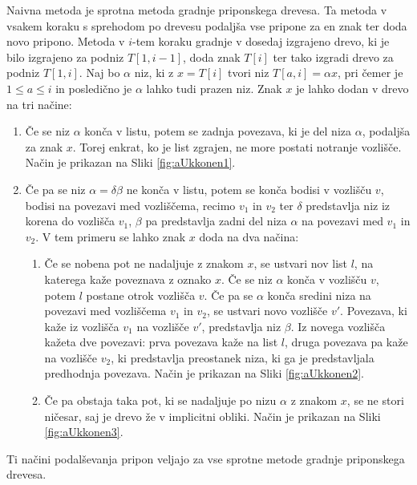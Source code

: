 Naivna metoda je sprotna metoda gradnje priponskega drevesa.
Ta metoda v vsakem koraku s sprehodom po drevesu podaljša vse pripone za en znak ter doda novo pripono. Metoda v $i$-tem koraku gradnje v dosedaj izgrajeno drevo, ki je bilo izgrajeno za podniz $T[1,i-1]$, doda znak $T[i]$ ter tako izgradi drevo za podniz $T[1,i]$. 
Naj bo $\alpha$ niz, ki z $x=T[i]$ tvori niz $T[a,i]=\alpha x$, pri čemer je $1\le a \le i $ in posledično je $\alpha$ lahko tudi prazen niz. Znak $x$ je lahko dodan v drevo na tri načine:
\begin{enumerate}
    \item \label{enum:dodajanje1} Če se niz $\alpha$ konča v listu, potem se zadnja povezava, ki je del niza $\alpha$, podaljša za znak $x$. Torej enkrat, ko je list zgrajen, ne more postati notranje vozlišče. Način je prikazan na Sliki \ref{fig:aUkkonen1}.
    \item Če pa se niz $\alpha=\delta\beta$ ne konča v listu, potem se konča bodisi v vozlišču $v$, bodisi na povezavi med vozliščema, recimo $v_1$ in $v_2$ ter $\delta$ predstavlja niz iz korena do vozlišča $v_1$, $\beta$ pa predstavlja zadni del niza $\alpha$ na povezavi med $v_1$ in $v_2$. V tem primeru se lahko znak $x$ doda na dva načina:
    \begin{enumerate}
        \item \label{enum:dodajanje2} Če se nobena pot ne nadaljuje z znakom $x$, se ustvari nov list $l$, na katerega kaže poveznava z oznako $x$. Če se niz $\alpha$ konča v vozlišču $v$, potem $l$ postane otrok vozlišča $v$. Če pa se $\alpha$ konča sredini niza na povezavi med vozliščema $v_1$ in $v_2$, se ustvari novo vozlišče $v'$. Povezava, ki kaže iz vozlišča $v_1$ na vozlišče $v'$, predstavlja niz $\beta$. Iz novega vozlišča kažeta dve povezavi: prva povezava kaže na list $l$, druga povezava pa kaže na vozlišče $v_2$, ki predstavlja preostanek niza, ki ga je predstavljala predhodnja povezava. Način je prikazan na Sliki \ref{fig:aUkkonen2}.
        \item \label{enum:dodajanje3} Če pa obstaja taka pot, ki se nadaljuje po nizu $\alpha$ z znakom $x$, se ne stori ničesar, saj je drevo že v implicitni obliki. Način je prikazan na Sliki \ref{fig:aUkkonen3}.
    \end{enumerate}    
\end{enumerate}
Ti načini podalševanja pripon veljajo za vse sprotne metode gradnje priponskega drevesa.
